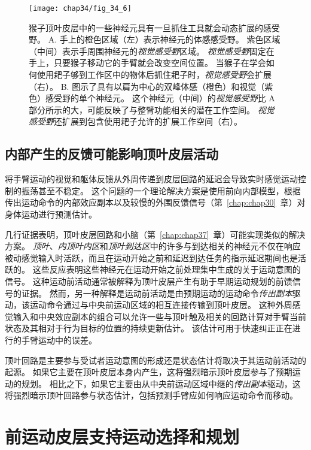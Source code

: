 \begin{figure}[htbp]
	\centering
	\texttt{[image: chap34/fig\_34\_6]}
	\caption{猴子顶叶皮层中的一些神经元具有一旦抓住工具就会动态扩展的感受野\cite{maravita2004tools}。
		A. 手上的橙色区域（左）表示神经元的体感感受野。
		紫色区域（中间）表示手周围神经元的\textit{视觉感受野}区域。
		\textit{视觉感受野}固定在手上，只要猴子移动它的手臂就会改变空间位置。
		当猴子在学会如何使用耙子够到工作区中的物体后抓住耙子时，\textit{视觉感受野}会扩展（右）。
		B. 图示了具有以肩为中心的双峰体感（橙色）和视觉（紫色）感受野的单个神经元。
		这个神经元（中间）的\textit{视觉感受野}比 A 部分所示的大，可能反映了与整臂功能相关的潜在工作空间。
		\textit{视觉感受野}还扩展到包含使用耙子允许的扩展工作空间（右）。}
	\label{fig:34_6}
\end{figure}



\subsection{内部产生的反馈可能影响顶叶皮层活动}

将手臂运动的视觉和躯体反馈从外周传递到皮层回路的延迟会导致实时感觉运动控制的振荡甚至不稳定。
这个问题的一个理论解决方案是使用前向内部模型，根据传出运动命令的内部效应副本以及较慢的外围反馈信号（第~\ref{chap:chap30}~章）对身体运动进行预测估计。


几行证据表明，顶叶皮层回路和小脑（第~\ref{chap:chap37}~章）可能实现类似的解决方案。
\textit{顶叶}、\textit{内顶叶内区}和\textit{顶叶到达区}中的许多与到达相关的神经元不仅在响应被动感觉输入时活跃，而且在运动开始之前和延迟到达任务的指示延迟期间也是活跃的。
这些反应表明这些神经元在运动开始之前处理集中生成的关于运动意图的信号。
这种运动前活动通常被解释为顶叶皮层产生有助于早期运动规划的前馈信号的证据。
然而，另一种解释是运动前活动是由预期运动的运动命令\textit{传出副本}驱动，该运动命令通过与中央前运动区域的相互连接传输到顶叶皮层。
这种外周感觉输入和中央效应副本的组合可以允许一些与顶叶触及相关的回路计算对手臂当前状态及其相对于行为目标的位置的持续更新估计。
该估计可用于快速纠正正在进行的手臂运动中的误差。


顶叶回路是主要参与受试者运动意图的形成还是状态估计将取决于其运动前活动的起源。
如果它主要在顶叶皮层本身内产生，这将强烈暗示顶叶皮层参与了预期运动的规划。
相比之下，如果它主要由从中央前运动区域中继的\textit{传出副本}驱动，这将强烈暗示顶叶回路参与状态估计，包括预测手臂应如何响应运动命令而移动。



\section{前运动皮层支持运动选择和规划}

